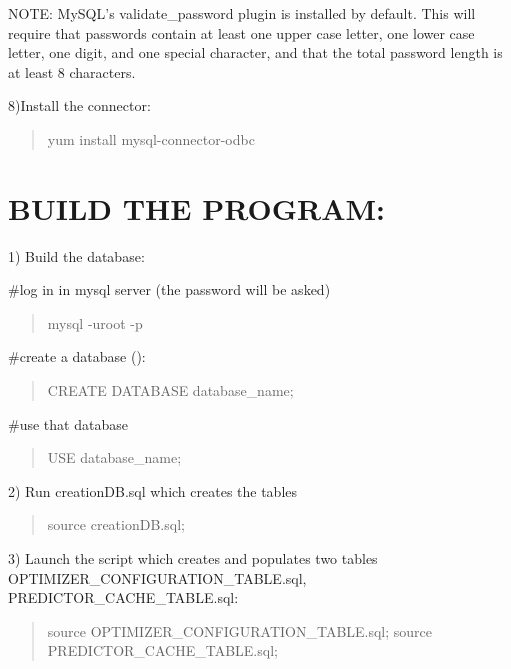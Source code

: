 N\-O\-T\-E\-: My\-S\-Q\-L's validate\-\_\-password plugin is installed by default. This will require that passwords contain at least one upper case letter, one lower case letter, one digit, and one special character, and that the total password length is at least 8 characters.

8)Install the connector\-: \begin{quotation}
yum install mysql-\/connector-\/odbc

\end{quotation}


\section*{B\-U\-I\-L\-D T\-H\-E P\-R\-O\-G\-R\-A\-M\-:}

1) Build the database\-:

\#log in in mysql server (the password will be asked) \begin{quotation}
mysql -\/uroot -\/p

\end{quotation}


\#create a database ()\-: \begin{quotation}
C\-R\-E\-A\-T\-E D\-A\-T\-A\-B\-A\-S\-E database\-\_\-name;

\end{quotation}


\#use that database \begin{quotation}
U\-S\-E database\-\_\-name;

\end{quotation}


2) Run creation\-D\-B.\-sql which creates the tables \begin{quotation}
source creation\-D\-B.\-sql;

\end{quotation}


3) Launch the script which creates and populates two tables O\-P\-T\-I\-M\-I\-Z\-E\-R\-\_\-\-C\-O\-N\-F\-I\-G\-U\-R\-A\-T\-I\-O\-N\-\_\-\-T\-A\-B\-L\-E.\-sql, P\-R\-E\-D\-I\-C\-T\-O\-R\-\_\-\-C\-A\-C\-H\-E\-\_\-\-T\-A\-B\-L\-E.\-sql\-: \begin{quotation}
source O\-P\-T\-I\-M\-I\-Z\-E\-R\-\_\-\-C\-O\-N\-F\-I\-G\-U\-R\-A\-T\-I\-O\-N\-\_\-\-T\-A\-B\-L\-E.\-sql; source P\-R\-E\-D\-I\-C\-T\-O\-R\-\_\-\-C\-A\-C\-H\-E\-\_\-\-T\-A\-B\-L\-E.\-sql;

\end{quotation}


